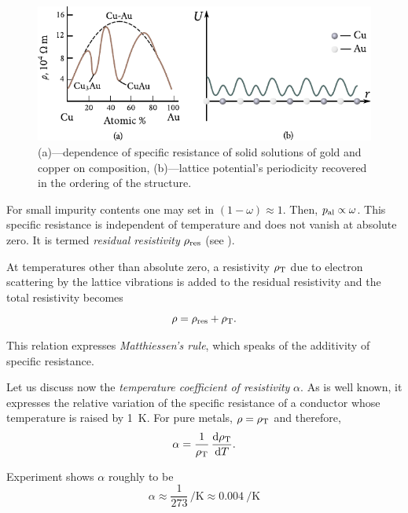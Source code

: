 \begin{figure}[t]
	\begin{center}
		\includegraphics[scale=1]{figures/ch_06/fig_6_12.pdf}
		\caption[]{(a)---dependence of specific resistance of solid solutions of gold and copper on composition, (b)---lattice potential's periodicity recovered in the ordering of the structure.}
		\label{fig:6_12}
	\end{center}
	\vspace{-0.7cm}
\end{figure}

For small impurity contents one may set in  $(1-\omega)\approx 1$. Then, $p_{\text{al}}\propto\omega$. This specific resistance is independent of temperature and does not vanish at absolute zero. It is termed \textit{residual resistivity} $\rho_{\text{res}}$ (see ).

At temperatures other than absolute zero, a resistivity $\rho_{\text{T}}$ due to electron scattering by the lattice vibrations is added to the residual resistivity and the total resistivity becomes
\begin{equation}\label{eq:6_32}
	\rho = \rho_{\text{res}} + \rho_{\text{T}}.
\end{equation}

\noindent
This relation expresses \textit{Matthiessen's rule}, which speaks of the additivity of specific resistance.

Let us discuss now the \textit{temperature coefficient of resistivity} $\alpha$. As is well known, it expresses the relative variation of the specific resistance of a conductor whose temperature is raised by \SI{1}{\kelvin}. For pure metals, $\rho = \rho_{\text{T}}$ and therefore,
\begin{equation}\label{eq:6_33}
	\alpha = \frac{1}{\rho_{\text{T}}}\, \dfrac{\mathrm{d}\rho_{\text{T}}}{\mathrm{d} T}.
\end{equation}

Experiment shows $\alpha$ roughly to be
\begin{equation*}
	\alpha \approx \frac{1}{273}\, \si{\per\kelvin} \approx \SI{0.004}{\per\kelvin}
\end{equation*}


